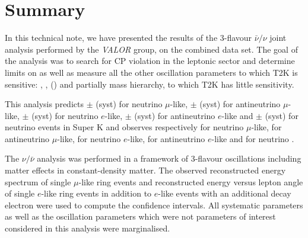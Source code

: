 \clearpage


\section{Summary}
\label{sec:summary}

In this technical note, we have presented the results of the 3-flavour $\bar{\nu}/\nu$ joint analysis performed by the {\em VALOR} group, on the combined \RunPeriod data set. The goal of the analysis was to search for CP violation in the leptonic sector and determine limits on \deltacp as well as measure all the other oscillation parameters to which T2K is sensitive: \ssqthonethree, \ssqthtwothree, \dmsqtwothree (\dmsqonethree) and partially mass hierarchy, to which T2K has little sensitivity.

This analysis predicts
\NskOscExpectationNumu{} $\pm$ \NskOscExpectationNumuError{} (syst) for neutrino $\mu$-like, \NskOscExpectationNumuBar{} $\pm$ \NskOscExpectationNumuBarError{} (syst) for antineutrino $\mu$-like, \NskOscExpectationNue{} $\pm$ \NskOscExpectationNueError{} (syst) for neutrino $e$-like, \NskOscExpectationNueBar{} $\pm$ \NskOscExpectationNueBarError{} (syst) for antineutrino $e$-like and \NskOscExpectationNueCConepi{} $\pm$ \NskOscExpectationNueCConepiError{} (syst) for neutrino \nueCConepi{} events in Super K and observes respectively \NskObservedNumu{} for neutrino $\mu$-like, \NskObservedNumuBar{}  for antineutrino $\mu$-like, \NskObservedNue{}  for neutrino $e$-like, \NskObservedNueBar{}  for antineutrino $e$-like and \NskObservedNueCConepi{} for neutrino \nueCConepi{}. 

The $\nu/\bar{\nu}$ analysis was performed in a framework of 3-flavour oscillations including matter effects in constant-density matter. The observed reconstructed energy spectrum of single $\mu$-like ring events and reconstructed energy versus lepton angle of single $e$-like ring events in addition to $e$-like events with an additional decay electron were used to compute the confidence intervals. All \NSyst{} systematic parameters as well as the oscillation parameters which were not parameters of interest considered in this analysis were marginalised.

\clearpage

